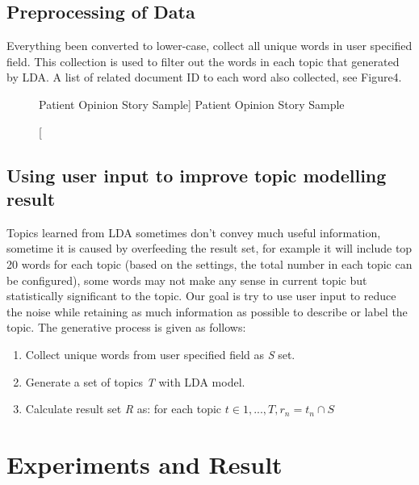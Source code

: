 \documentclass[11pt,twoside]{report}
\begin{document}
\section{Preprocessing of Data}

Everything been converted to lower-case, collect all unique words in user specified field. This collection is used to filter out the words in each topic that generated by LDA. A list of related document ID to each word also collected, see Figure4.

\begin{figure}[tp]
    \begin{center}
    \caption
    [Patient Opinion Story Sample]
    {
    Patient Opinion Story Sample
    \label{Figure4}
    }
    \end{center}
\end{figure}

\section{Using user input to improve topic modelling result}

Topics learned from LDA sometimes don’t convey much useful information, sometime it is caused by overfeeding the result set, for example it will include top 20 words for each topic (based on the settings, the total number in each topic can be configured), some words may not make any sense in current topic but statistically significant to the topic. Our goal  is try to use user input to reduce the noise while retaining as much information as possible to describe or label the topic. The generative process is given as follows: 
\begin{enumerate}
\item Collect unique words from user specified field as \textit{S} set.
\item Generate a set of topics \textit{T} with LDA model.
\item Calculate result set \textit{R} as: for each topic $t\in{1,...,T}, r_n = t_n \cap S$
\end{enumerate}

\chapter{Experiments and Result}
\end{document}
